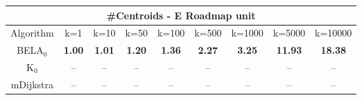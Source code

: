 \begin{tabular}{c|cccccccc}\toprule
\multicolumn{9}{c}{#Centroids - E Roadmap unit}\\ \midrule
Algorithm & k=1 & k=10 & k=50 & k=100 & k=500 & k=1000 & k=5000 & k=10000 \\ \midrule
BELA$_0$ & \textbf{1.00} & \textbf{1.01} & \textbf{1.20} & \textbf{1.36} & \textbf{2.27} & \textbf{3.25} & \textbf{11.93} & \textbf{18.38} \\
K$_0$ & -- & -- & -- & -- & -- & -- & -- & -- \\
mDijkstra & -- & -- & -- & -- & -- & -- & -- & -- \\ \bottomrule 
\end{tabular}
